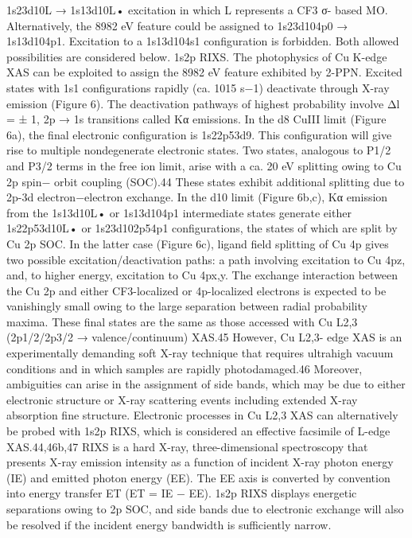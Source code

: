 1s23d10L → 1s13d10L• excitation in which L represents a CF3 σ-
based MO. Alternatively, the 8982 eV feature could be assigned
to 1s23d104p0 → 1s13d104p1. Excitation to a 1s13d104s1
conﬁguration is forbidden. Both allowed possibilities are
considered below.
1s2p RIXS. The photophysics of Cu K-edge XAS can be
exploited to assign the 8982 eV feature exhibited by 2-PPN.
Excited states with 1s1 conﬁgurations rapidly (ca. 1015 s−1)
deactivate through X-ray emission (Figure 6). The deactivation
pathways of highest probability involve Δl = ± 1, 2p → 1s
transitions called Kα emissions. In the d8 CuIII limit (Figure
6a), the ﬁnal electronic conﬁguration is 1s22p53d9. This
conﬁguration will give rise to multiple nondegenerate electronic
states. Two states, analogous to P1/2 and P3/2 terms in the free
ion limit, arise with a ca. 20 eV splitting owing to Cu 2p spin−
orbit coupling (SOC).44 These states exhibit additional splitting
due to 2p-3d electron−electron exchange. In the d10 limit
(Figure 6b,c), Kα emission from the 1s13d10L• or 1s13d104p1
intermediate states generate either 1s22p53d10L• or
1s23d102p54p1 conﬁgurations, the states of which are split by
Cu 2p SOC. In the latter case (Figure 6c), ligand ﬁeld splitting
of Cu 4p gives two possible excitation/deactivation paths: a
path involving excitation to Cu 4pz, and, to higher energy,
excitation to Cu 4px,y. The exchange interaction between the
Cu 2p and either CF3-localized or 4p-localized electrons is
expected to be vanishingly small owing to the large separation
between radial probability maxima.
These ﬁnal states are the same as those accessed with Cu L2,3
(2p1/2/2p3/2 → valence/continuum) XAS.45 However, Cu L2,3-
edge XAS is an experimentally demanding soft X-ray technique
that requires ultrahigh vacuum conditions and in which samples
are rapidly photodamaged.46 Moreover, ambiguities can arise in
the assignment of side bands, which may be due to either
electronic structure or X-ray scattering events including
extended X-ray absorption ﬁne structure. Electronic processes
in Cu L2,3 XAS can alternatively be probed with 1s2p RIXS,
which is considered an eﬀective facsimile of L-edge XAS.44,46b,47
RIXS is a hard X-ray, three-dimensional spectroscopy that
presents X-ray emission intensity as a function of incident X-ray
photon energy (IE) and emitted photon energy (EE). The EE
axis is converted by convention into energy transfer ET (ET =
IE − EE). 1s2p RIXS displays energetic separations owing to 2p
SOC, and side bands due to electronic exchange will also be
resolved if the incident energy bandwidth is suﬃciently narrow.
